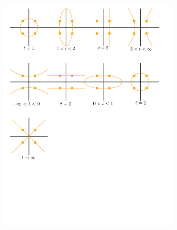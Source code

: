 \documentclass[12pt]{memoir}
\begin{document}
\begin{figure}[h!]
    \centering
    \includegraphics[width=0.8\textwidth, trim= 0.8cm 21cm 0.8cm 0.6cm,clip]{fig1.pdf}
\end{figure}
\end{document}
